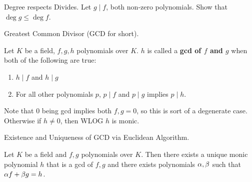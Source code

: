 \documentclass[../book.tex]{subfiles}
\begin{document}
\begin{ex} Degree respects Divides.
    Let $g \mid f$, both non-zero polynomials. Show that $\deg g \leq \deg f$. 
\end{ex}
\begin{dfn} Greatest Common Divisor (GCD for short). 

    Let $K$ be a field, $f, g, h$ polynomials over $K$. 
    $h$ is called a \textbf{gcd of $f$ and $g$} when both of the following are true:
    \begin{enumerate}
        \item $h \mid f$ and $h \mid g$
        \item For all other polynomials $p$, 
        $p \mid f$ and $p \mid g$ implies $p \mid h$.
    \end{enumerate}
    Note that $0$ being gcd implies both $f, g = 0$,
    so this is sort of a degenerate case. 
    Otherwise if $h \neq 0$, then WLOG $h$ is monic.
\end{dfn}
\begin{thm} Existence and Uniqueness of GCD via Euclidean Algorithm. 

    Let $K$ be a field and $f, g$ polynomials over $K$. 
    Then there exists a unique monic polynomial $h$ that is a gcd of $f, g$ 
    and there exists polynomials $\alpha, \beta$ such that $\alpha f + \beta g = h$.
    
\end{thm}
\end{document}
